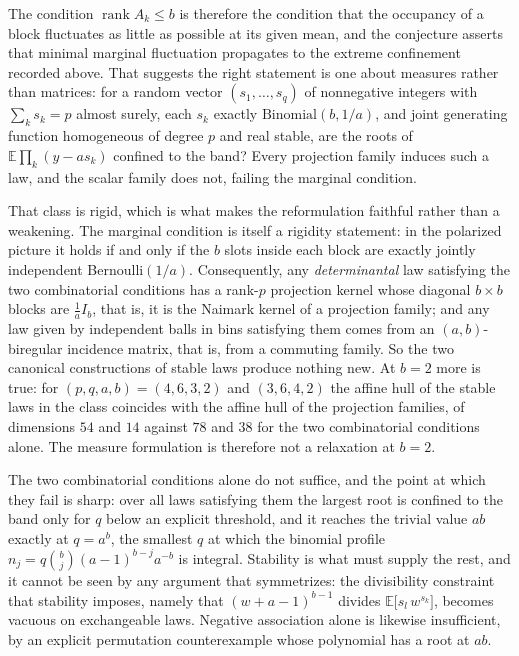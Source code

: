 \documentclass[11pt]{article}
\theoremstyle{remark}
\begin{document}
The condition $\operatorname{rank}A_k\le b$ is therefore the condition that the
occupancy of a block fluctuates as little as possible at its given mean, and the
conjecture asserts that minimal marginal fluctuation propagates to the extreme
confinement recorded above. That suggests the right statement is one about measures
rather than matrices: for a random vector $(s_1,\dots,s_q)$ of nonnegative integers
with $\sum_ks_k=p$ almost surely, each $s_k$ exactly $\mathrm{Binomial}(b,1/a)$, and
joint generating function homogeneous of degree $p$ and real stable, are the roots
of $\mathbb E\prod_k(y-as_k)$ confined to the band? Every projection family induces
such a law, and the scalar family does not, failing the marginal condition.

That class is rigid, which is what makes the reformulation faithful rather than a
weakening. The marginal condition is itself a rigidity statement: in the polarized
picture it holds if and only if the $b$ slots inside each block are exactly jointly
independent Bernoulli$(1/a)$. Consequently, any \emph{determinantal} law satisfying
the two combinatorial conditions has a rank-$p$ projection kernel whose diagonal
$b\times b$ blocks are $\tfrac1aI_b$, that is, it is the Naimark kernel of a
projection family; and any law given by independent balls in bins satisfying them
comes from an $(a,b)$-biregular incidence matrix, that is, from a commuting family.
So the two canonical constructions of stable laws produce nothing new. At $b=2$ more
is true: for $(p,q,a,b)=(4,6,3,2)$ and $(3,6,4,2)$ the affine hull of the stable laws
in the class coincides with the affine hull of the projection families, of dimensions
$54$ and $14$ against $78$ and $38$ for the two combinatorial conditions alone. The
measure formulation is therefore not a relaxation at $b=2$.

The two combinatorial conditions alone do not suffice, and the point at which they
fail is sharp: over all laws satisfying them the largest root is confined to the band
only for $q$ below an explicit threshold, and it reaches the trivial value $ab$
exactly at $q=a^b$, the smallest $q$ at which the binomial profile
$n_j=q\binom bj(a-1)^{b-j}a^{-b}$ is integral. Stability is what must supply the
rest, and it cannot be seen by any argument that symmetrizes: the divisibility
constraint that stability imposes, namely that $(w+a-1)^{b-1}$ divides
$\mathbb E\bigl[s_l\,w^{s_k}\bigr]$, becomes vacuous on exchangeable laws.
Negative association alone is likewise insufficient, by an explicit permutation
counterexample whose polynomial has a root at $ab$.
\end{document}
